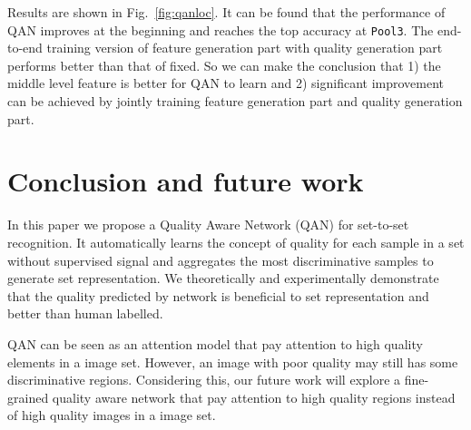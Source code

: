 \documentclass[10pt,twocolumn,letterpaper]{article}
\begin{document}
Results are shown in Fig.~\ref{fig:qanloc}. It can be found that the performance of QAN improves at the beginning and reaches the top accuracy at \texttt{Pool3}. The end-to-end training version of feature generation part with quality generation part performs better than that of fixed. So we can make the conclusion that 1) the middle level feature is better for QAN to learn and 2) significant improvement can be achieved by jointly training feature generation part and quality generation part. \section{Conclusion and future work}
\label{diss}
In this paper we propose a Quality Aware Network (QAN) for set-to-set recognition. It automatically learns the concept of quality for each sample in a set without supervised signal and aggregates the most discriminative samples to generate set representation. We theoretically and experimentally demonstrate that the quality predicted by network is beneficial to set representation and better than human labelled. 

QAN can be seen as an attention model that pay attention to high quality elements in a image set. However, an image with poor quality may still has some discriminative regions. Considering this, our future work will explore a fine-grained quality aware network that pay attention to high quality regions instead of high quality images in a image set.
 \newpage
\begin{spacing}{0.1}

\footnotesize


 

\end{spacing}
\end{document}
